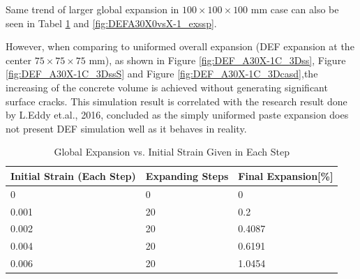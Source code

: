 Same trend of larger global expansion in $100 \times 100 \times 100$ mm case can also be seen in Tabel \ref{table:DEF_X-1_EssXP} and \ref{fig:DEFA30X0vsX-1_exssp}.

However, when comparing to uniformed overall expansion (DEF expansion at the center $75 \times 75 \times 75$ mm), as shown in Figure \ref{fig:DEF_A30X-1C_3Dss}, Figure \ref{fig:DEF_A30X-1C_3DssS} and Figure \ref{fig:DEF_A30X-1C_3Dcasd},the increasing of the concrete volume is achieved without generating significant surface cracks. This simulation result is correlated with the research result done by L.Eddy et.al., 2016\cite{Eddy}, concluded as the simply uniformed paste expansion does not present DEF simulation well as it behaves in reality.

\begin{table}[ht!]
  \caption{Global Expansion vs. Initial Strain Given in Each Step}
\centering
\begin{tabular}{ ||p{2cm}|p{2cm}|p{2cm}| }
 \hline
    Initial Strain (Each Step) & Expanding Steps &  Final Expansion[\%] \\ [0.5ex]
 \hline\hline
  0 & 0 & 0 \\
  0.001 & 20 & 0.2 \\
  0.002 & 20 & 0.4087 \\
  0.004 & 20 & 0.6191 \\
  0.006 & 20 & 1.0454 \\
 \hline
\end{tabular}

\label{table:DEF_X-1_EssXP}
\end{table}

